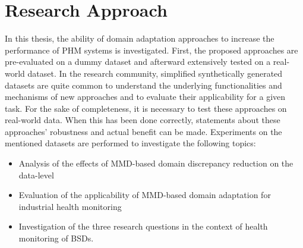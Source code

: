 \section{Research Approach}
In this thesis, the ability of domain adaptation approaches to increase the performance of PHM systems is investigated. First, the proposed approaches are pre-evaluated on a dummy dataset and afterward extensively tested on a real-world dataset. In the research community, simplified synthetically generated datasets are quite common to understand the underlying functionalities and mechanisms of new approaches and to evaluate their applicability for a given task. For the sake of completeness, it is necessary to test these approaches on real-world data. When this has been done correctly, statements about these approaches' robustness and actual benefit can be made. Experiments on the mentioned datasets are performed to investigate the following topics:
\begin{itemize}
    \item Analysis of the effects of MMD-based domain discrepancy reduction on the data-level
    \item Evaluation of the applicability of MMD-based domain adaptation for industrial health monitoring
    \item Investigation of the three research questions in the context of health monitoring of BSDs.
\end{itemize}

